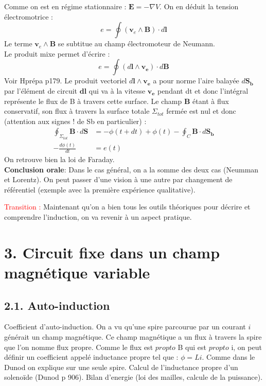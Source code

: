 \documentclass[french, a4paper, 10pt, twocolumn, landscape]{article}
\begin{document}
 Comme on est en régime stationnaire :    $\mathbf E = - \nabla V$. On en déduit la tension électromotrice :
 \begin{equation}
     e = \oint (\mathbf v_e \land \mathbf B) \cdot d\mathbf{l}
 \end{equation}
 Le terme $\mathbf v_e \land \mathbf B$ se subtitue au champ électromoteur de Neumann.\\
 
 Le produit mixe permet d'écrire : 
 \begin{equation}
     e = \oint (d\mathbf {l} \land \mathbf{v_e}) \cdot d\mathbf{B} 
 \end{equation}
Voir Hprépa p179. Le produit vectoriel $d\mathbf {l} \land \mathbf{v_e}$ a pour norme l'aire balayée $d\mathbf{S_b}$ par l'élément de circuit $\mathbf{dl}$ qui va à la vitesse $\mathbf{v_e}$ pendant dt et donc l'intégral représente le flux de B à travers cette surface. Le champ $\mathbf{B}$ étant à flux conservatif, son flux à travers la surface totale $\Sigma_{tot}$ fermée est nul et donc (attention aux signes ! de Sb en particulier) :
\begin{align}
    \oint_{\Sigma_{tot}}\mathbf{B}\cdot d\mathbf{S} &= -\phi(t+dt) + \phi(t) - \oint_{C}\mathbf{B}\cdot d\mathbf{S_b} \\
    -\frac{d\phi(t)}{dt} &= e(t)
\end{align}
On retrouve bien la loi de Faraday.\\

\textbf{Conclusion orale}: Dans le cas général, on a la somme des deux cas (Neumman et Lorentz). On peut passer d'une vision à une autre par changement de référentiel (exemple avec la première expérience qualitative).

\textcolor{red}{Transition :} Maintenant qu'on a bien tous les outils théoriques pour décrire et comprendre l'induction, on va revenir à un aspect pratique.



\section*{3. Circuit fixe dans un champ magnétique variable}

\subsection*{2.1. Auto-induction}

Coefficient d'auto-induction. On a vu qu'une spire parcourue par un courant $i$ générait un champ magnétique. Ce champ magnétique a un flux à travers la spire que l'on nomme flux propre. Comme le flux est $propto$ B qui est $propto$ i, on peut définir un coefficient appelé inductance propre tel que : $\phi=Li$. Comme dans le Dunod on explique sur une seule spire. Calcul de l'inductance propre d'un solenoïde (Dunod p 906). Bilan d'energie (loi des mailles, calcule de la puissance).
\end{document}
